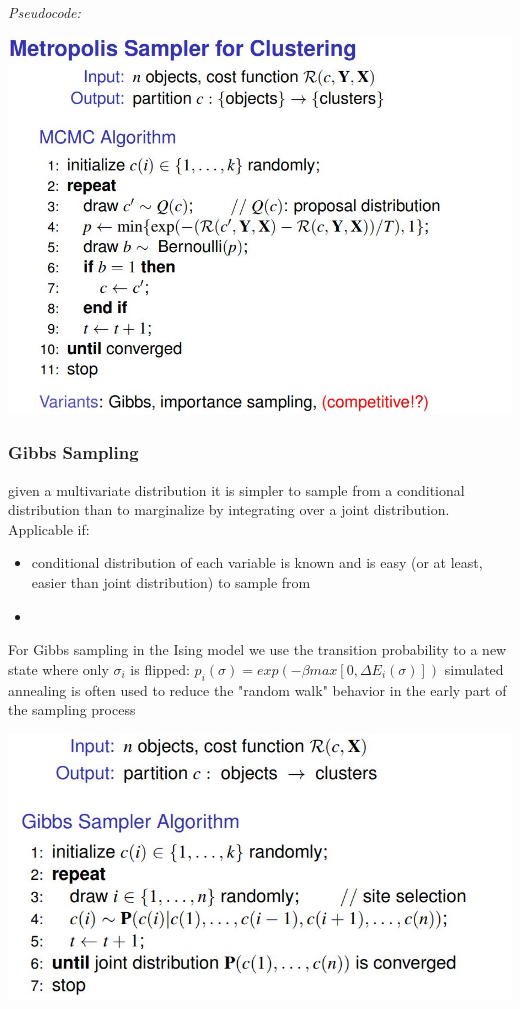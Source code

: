 \documentclass[9pt,parskip]{scrartcl}
\begin{document}
\begin{multicols*}{4}
\textit{Pseudocode:}

\begin{center}
\includegraphics[width=0.9\linewidth]{pictures/MCMC.jpg}

\end{center}

\subsubsection*{Gibbs Sampling}
given a multivariate distribution it is simpler to sample from a conditional distribution than to marginalize by integrating over a joint distribution. \\
Applicable if:
\begin{itemize}
	\item conditional distribution of each variable is known and is easy (or at least, easier than joint distribution) to sample from
	\item 
\end{itemize}
For Gibbs sampling in the Ising model we use the transition probability to a new state where only $\sigma_i$ is flipped: $p_i(\sigma) = exp(-\beta max[0,\Delta E_i(\sigma)])$ 
 simulated annealing is often used to reduce the "random walk" behavior in the early part of the sampling process

\begin{center}
\includegraphics[width=0.9\linewidth]{pictures/gibbsSampler.jpg}


\end{center}
\end{multicols*}
\end{document}
